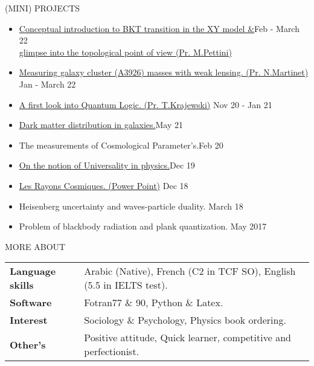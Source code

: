 \documentclass{resume} %
\begin{document}
\begin{rSection}{(MINI) PROJECTS}
\begin{itemize} 
    \item \href{https://github.com/PhysicsAbdelhamid/Reports_and_Presentations}{Conceptual introduction to BKT transition in the XY model \&}\hfill Feb - March 22\\\href{https://github.com/PhysicsAbdelhamid/Reports_and_Presentations}{glimpse into the topological point of view (Pr. M.Pettini)}
	\item \href{https://github.com/PhysicsAbdelhamid/Reports_and_Presentations}{Measuring galaxy cluster (A3926) masses with weak lensing. (Pr. N.Martinet)} \hfill Jan - March 22
	\item \href{https://github.com/PhysicsAbdelhamid/Reports_and_Presentations}{A first look into Quantum Logic. (Pr. T.Krajewski)} \hfill Nov 20 - Jan 21
	\item \href{https://github.com/PhysicsAbdelhamid/Reports_and_Presentations}{Dark matter distribution in galaxies.}\hfill May 21
    \item The measurements of Cosmological Parameter’s.\hfill Feb 20
    \item \href{https://github.com/PhysicsAbdelhamid/Reports_and_Presentations}{On the notion of Universality in physics.}\hfill Dec 19
    \item \href{https://github.com/PhysicsAbdelhamid/Reports_and_Presentations}{Les Rayons Cosmiques. (Power Point)} \hfill Dec 18
    \item Heisenberg uncertainty and waves-particle duality. \hfill March 18
    \item Problem of blackbody radiation and plank quantization. \hfill May 2017
\end{itemize}

\end{rSection}


\begin{rSection}{MORE ABOUT}

\begin{tabular}{ll}

\textbf{Language skills} & Arabic (Native), French (C2 in TCF SO), English (5.5 in IELTS test).\\
\textbf{Software} & Fotran77 \& 90, Python \& Latex.\\
\textbf{Interest} & Sociology \& Psychology, Physics book ordering.\\
\textbf{Other's} & Positive attitude, Quick learner, competitive and perfectionist.

\end{tabular}

\end{rSection} 
\end{document}
